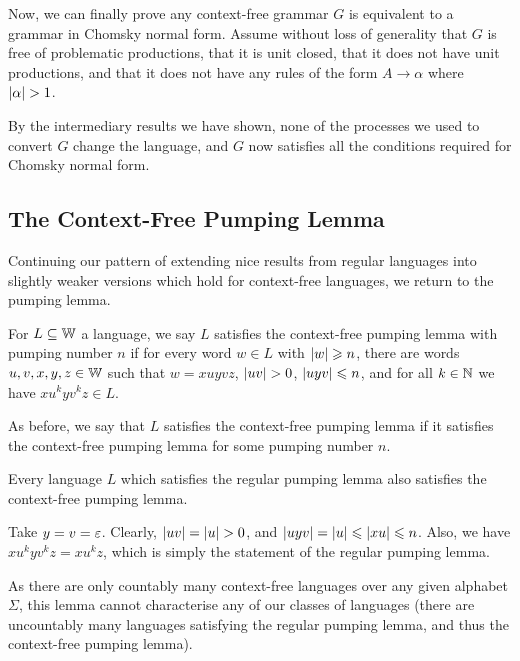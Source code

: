 \documentclass{article}
\begin{document}
\begin{prf}
	Now, we can finally prove any context-free grammar $G$ is equivalent to a grammar in Chomsky normal form. Assume without loss of generality that $G$ is free of problematic productions, that it is unit closed, that it does not have unit productions, and that it does not have any rules of the form $A \to \alpha$ where $\left\lvert \alpha \right\rvert > 1$.
		
	By the intermediary results we have shown, none of the processes we used to convert $G$ change the language, and $G$ now satisfies all the conditions required for Chomsky normal form.
\end{prf}

\subsection{The Context-Free Pumping Lemma}

Continuing our pattern of extending nice results from regular languages into slightly weaker versions which hold for context-free languages, we return to the pumping lemma.

\begin{definition}
	For $L \subseteq \mathbb{W}$ a language, we say $L$ satisfies the context-free pumping lemma with pumping number $n$ if for every word $w \in L$ with $\left\lvert w \right\rvert \geqslant n$, there are words $u, v, x, y, z \in \mathbb{W}$ such that $w = xuyvz$, $\left\lvert uv \right\rvert > 0$, $\left\lvert uyv \right\rvert \leqslant n$, and for all $k \in \mathbb{N}$ we have $xu^kyv^kz \in L$.
	    
	As before, we say that $L$ satisfies the context-free pumping lemma if it satisfies the context-free pumping lemma for some pumping number $n$.
\end{definition}

\begin{proposition}
	Every language $L$ which satisfies the regular pumping lemma also satisfies the context-free pumping lemma.
\end{proposition}

\begin{prf}
	Take $y = v = \varepsilon$. Clearly, $\left\lvert uv \right\rvert = \left\lvert u \right\rvert > 0$, and $\left\lvert uyv \right\rvert = \left\lvert u \right\rvert \leqslant \left\lvert xu \right\rvert \leqslant n$. Also, we have $xu^kyv^kz = xu^kz$, which is simply the statement of the regular pumping lemma.
\end{prf}

\begin{corollary}
	As there are only countably many context-free languages over any given alphabet $\Sigma$, this lemma cannot characterise any of our classes of languages (there are uncountably many languages satisfying the regular pumping lemma, and thus the context-free pumping lemma).
\end{corollary}
\end{document}
